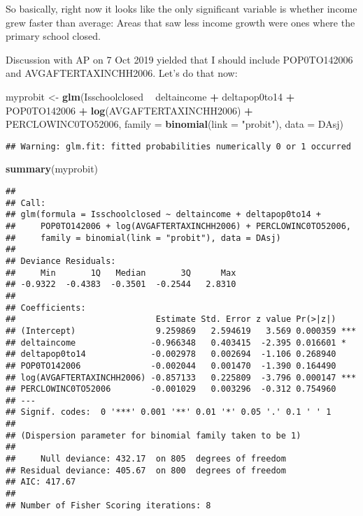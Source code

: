 \documentclass[]{article}
\newenvironment{Shaded}{\begin{snugshade}}{\end{snugshade}}
\newcommand{\DataTypeTok}[1]{\textcolor[rgb]{0.13,0.29,0.53}{#1}}
\newcommand{\KeywordTok}[1]{\textcolor[rgb]{0.13,0.29,0.53}{\textbf{#1}}}
\newcommand{\NormalTok}[1]{#1}
\newcommand{\OperatorTok}[1]{\textcolor[rgb]{0.81,0.36,0.00}{\textbf{#1}}}
\newcommand{\StringTok}[1]{\textcolor[rgb]{0.31,0.60,0.02}{#1}}
\begin{document}
So basically, right now it looks like the only significant variable is
whether income grew faster than average: Areas that saw less income
growth were ones where the primary school closed.

Discussion with AP on 7 Oct 2019 yielded that I should include
POP0TO142006 and AVGAFTERTAXINCHH2006. Let's do that now:

\begin{Shaded}
\begin{Highlighting}[]
\NormalTok{myprobit <-}\StringTok{ }\KeywordTok{glm}\NormalTok{(Isschoolclosed }\OperatorTok{~}\StringTok{ }\NormalTok{deltaincome }\OperatorTok{+}\StringTok{ }\NormalTok{deltapop0to14 }\OperatorTok{+}\StringTok{ }\NormalTok{POP0TO142006 }\OperatorTok{+}\StringTok{ }\KeywordTok{log}\NormalTok{(AVGAFTERTAXINCHH2006) }\OperatorTok{+}\StringTok{ }\NormalTok{PERCLOWINC0TO52006, }\DataTypeTok{family =} \KeywordTok{binomial}\NormalTok{(}\DataTypeTok{link =} \StringTok{"probit"}\NormalTok{), }\DataTypeTok{data =}\NormalTok{ DAsj)}
\end{Highlighting}
\end{Shaded}

\begin{verbatim}
## Warning: glm.fit: fitted probabilities numerically 0 or 1 occurred
\end{verbatim}

\begin{Shaded}
\begin{Highlighting}[]
\KeywordTok{summary}\NormalTok{(myprobit)}
\end{Highlighting}
\end{Shaded}

\begin{verbatim}
## 
## Call:
## glm(formula = Isschoolclosed ~ deltaincome + deltapop0to14 + 
##     POP0TO142006 + log(AVGAFTERTAXINCHH2006) + PERCLOWINC0TO52006, 
##     family = binomial(link = "probit"), data = DAsj)
## 
## Deviance Residuals: 
##     Min       1Q   Median       3Q      Max  
## -0.9322  -0.4383  -0.3501  -0.2544   2.8310  
## 
## Coefficients:
##                            Estimate Std. Error z value Pr(>|z|)    
## (Intercept)                9.259869   2.594619   3.569 0.000359 ***
## deltaincome               -0.966348   0.403415  -2.395 0.016601 *  
## deltapop0to14             -0.002978   0.002694  -1.106 0.268940    
## POP0TO142006              -0.002044   0.001470  -1.390 0.164490    
## log(AVGAFTERTAXINCHH2006) -0.857133   0.225809  -3.796 0.000147 ***
## PERCLOWINC0TO52006        -0.001029   0.003296  -0.312 0.754960    
## ---
## Signif. codes:  0 '***' 0.001 '**' 0.01 '*' 0.05 '.' 0.1 ' ' 1
## 
## (Dispersion parameter for binomial family taken to be 1)
## 
##     Null deviance: 432.17  on 805  degrees of freedom
## Residual deviance: 405.67  on 800  degrees of freedom
## AIC: 417.67
## 
## Number of Fisher Scoring iterations: 8
\end{verbatim}
\end{document}
